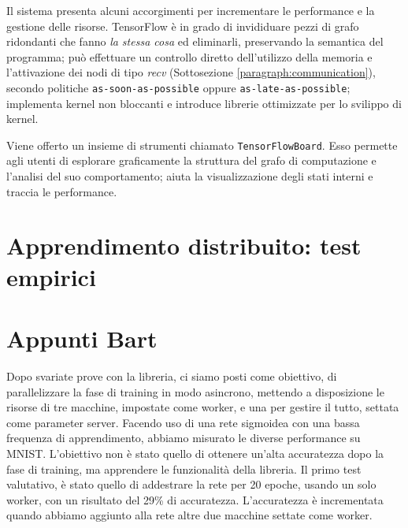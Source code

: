 \documentclass[DIV=calc, paper=a4, fontsize=11pt]{scrartcl}	 %
\begin{document}
\begin{multicols}{2}
		Il sistema presenta alcuni accorgimenti per incrementare le performance e la gestione delle risorse. TensorFlow è in grado di invididuare pezzi di grafo ridondanti che fanno \textit{la stessa cosa} ed eliminarli, preservando la semantica del programma; può effettuare un controllo diretto dell'utilizzo della memoria e l'attivazione dei nodi di tipo \textit{recv} (Sottosezione \ref{paragraph:communication}), secondo politiche \texttt{as-soon-as-possible} oppure \texttt{as-late-as-possible}; implementa kernel non bloccanti e introduce librerie ottimizzate per lo svilippo di kernel.
		
		Viene offerto un insieme di strumenti chiamato \texttt{TensorFlowBoard}. Esso permette agli utenti di esplorare graficamente la struttura del grafo di computazione e l'analisi del suo comportamento; aiuta la visualizzazione degli stati interni e traccia le performance.
		
		\section{Apprendimento distribuito: test empirici}
		
		\section{Appunti Bart}		
		Dopo svariate prove con la libreria, ci siamo posti come obiettivo, di parallelizzare la fase di training in modo asincrono, mettendo a disposizione le risorse di tre macchine, impostate come worker, e una per gestire il tutto, settata come parameter server. Facendo uso di una rete sigmoidea con una bassa frequenza di apprendimento, abbiamo misurato le diverse performance su MNIST. L'obiettivo non è stato quello di ottenere un'alta accuratezza dopo la fase di training, ma apprendere le funzionalità della libreria.
		Il primo test valutativo, è stato quello di addestrare la rete per 20 epoche, usando un solo worker, con un risultato del 29\% di accuratezza. L'accuratezza è incrementata quando abbiamo aggiunto alla rete altre due macchine settate come worker.

\end{multicols}
\end{document}
